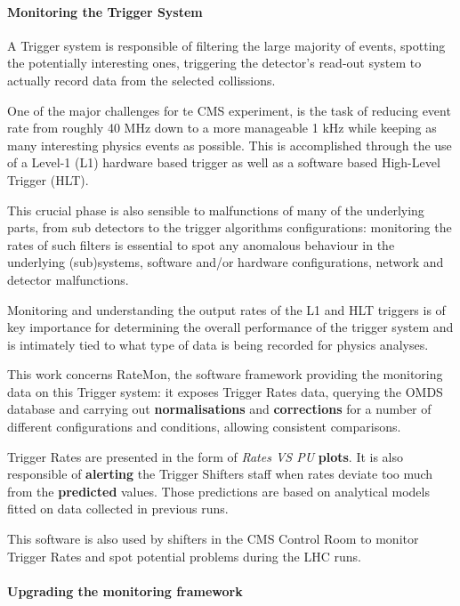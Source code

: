 \documentclass[a4, oneside, 10pt, nobib]{memoir}
\begin{document}
		\paragraph{Monitoring the Trigger System}

		A Trigger system is responsible of filtering the large majority of events, spotting the potentially interesting ones, triggering the detector's read-out system to actually record data from the selected collissions.

		One of the major challenges for te CMS experiment, is the task of reducing event rate from roughly 40 MHz down to a more manageable 1 kHz while keeping as many interesting physics events as possible. This is accomplished through the use of a Level-1 (L1) hardware based trigger as well as a software based High-Level Trigger (HLT). 

		This crucial phase is also sensible to malfunctions of many of the underlying parts, from sub detectors to the trigger algorithms configurations: monitoring the rates of such filters is essential to spot any anomalous behaviour in the underlying (sub)systems, software and/or hardware configurations, network and detector malfunctions.

		Monitoring and understanding the output rates of the L1 and HLT triggers is of key importance for determining the overall performance of the trigger system and is intimately tied to what type of data is being recorded for physics analyses.

		This work concerns RateMon, the software framework providing the monitoring data on this Trigger system: it exposes Trigger Rates data, querying the OMDS database and carrying out \textbf{normalisations} and \textbf{corrections} for a number of different configurations and conditions, allowing consistent comparisons.

		Trigger Rates are presented in the form of \textit{Rates VS PU} \textbf{plots}. It is also responsible of \textbf{alerting} the Trigger Shifters staff when rates deviate too much from the \textbf{predicted} values. Those predictions are based on analytical models fitted on data collected in previous runs.

		This software is also used by shifters in the CMS Control Room to monitor Trigger Rates and spot potential problems during the LHC runs.
		
		\paragraph{Upgrading the monitoring framework} 
\end{document}
